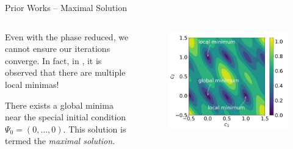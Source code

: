 \begin{frame}{Prior Works -- Maximal Solution}
    \begin{columns}
    \begin{column}{0.4\textwidth}
        Even with the phase reduced, we cannot ensure our iterations converge. In fact, in \cite{EnergyLandscpae}, it is observed that there are multiple local minimas!

        \vspace{1em}
        
        There exists a global minima near the special initial condition $\Psi_0 = (0,\ldots,0)$. This solution is termed the \textit{\color{red}maximal solution}.
    \end{column}
    \begin{column}{0.5\textwidth}
        \begin{figure}
            \centering
            \includegraphics[width=1\linewidth]{figures/energy_landscape.jpg}
        \end{figure}
    \end{column}
    \end{columns}
\end{frame}

